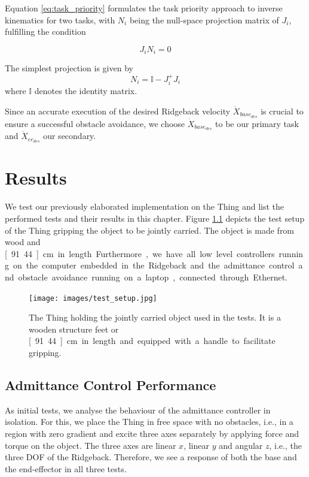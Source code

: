 Equation \ref{eq:task_priority} formulates the task priority approach to inverse kinematics for two tasks, with $N_i$ being the null-space projection matrix of $J_i$, fulfilling the condition

\begin{equation}
J_i N_i = 0
\end{equation}

The simplest projection is given by
\begin{equation}
N_i = \mathbb{I} - J_i^+J_i
\end{equation}
where $\mathbb{I}$ denotes the identity matrix.

Since an accurate execution of the desired Ridgeback velocity $\dot{X}_{base_{des}}$ is crucial to ensure a successful obstacle avoidance, we choose $\dot{X}_{base_{des}}$ to be our primary task and $\dot{X}_{ee_{des}}$ our secondary.

\chapter{Results}
We test our previously elaborated implementation on the Thing and list the performed tests and their results in this chapter. Figure \ref{pics:test_setup} depicts the test setup of the Thing gripping the object to be jointly carried. The object is made from wood and \unit[91.44]{cm} in length. Furthermore, we have all low level controllers running on the computer embedded in the Ridgeback and the admittance control and obstacle avoidance running on a laptop, connected through Ethernet.


\begin{figure}[h]
   \centering
   \texttt{[image: images/test\_setup.jpg]}
   \caption{The Thing holding the jointly carried object used in the tests. It is a wooden structure \unit[3]{feet} or \unit[91.44]{cm} in length and equipped with a handle to facilitate gripping.}
   \label{pics:test_setup}
\end{figure}

\section{Admittance Control Performance}
	\label{sec:adm_ctrl_performance}
As initial tests, we analyse the behaviour of the admittance controller in isolation. For this, we place the Thing in free space with no obstacles, i.e., in a region with zero gradient and excite three axes separately by applying force and torque on the object. The three axes are linear $x$, linear $y$ and angular $z$, i.e., the three DOF of the Ridgeback. Therefore, we see a response of both the base and the end-effector in all three tests.

